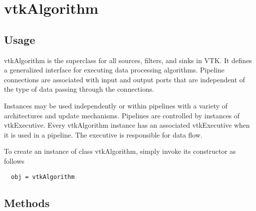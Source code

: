 \section{vtkAlgorithm}

\subsection{Usage}

 vtkAlgorithm is the superclass for all sources, filters, and sinks
 in VTK.  It defines a generalized interface for executing data
 processing algorithms.  Pipeline connections are associated with
 input and output ports that are independent of the type of data
 passing through the connections.

 Instances may be used independently or within pipelines with a
 variety of architectures and update mechanisms.  Pipelines are
 controlled by instances of vtkExecutive.  Every vtkAlgorithm
 instance has an associated vtkExecutive when it is used in a
 pipeline.  The executive is responsible for data flow.

To create an instance of class vtkAlgorithm, simply
invoke its constructor as follows
\begin{verbatim}
  obj = vtkAlgorithm
\end{verbatim}
\subsection{Methods}

